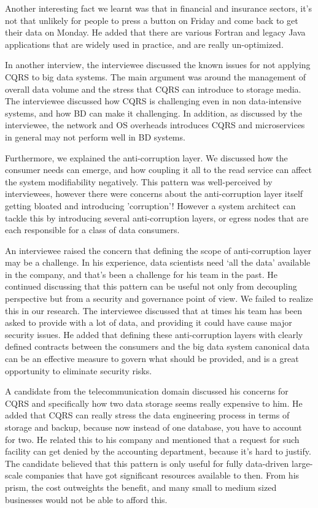 \documentclass{bmcart}
\begin{document}
Another interesting fact we learnt was that in financial and insurance sectors, it's not that unlikely for people to press a button on Friday and come back to get their data on Monday. He added that there are various Fortran and legacy Java applications that are widely used in practice, and are really un-optimized.


In another interview, the interviewee discussed the known issues for not applying CQRS to big data systems. The main argument was around the management of overall data volume and the stress that CQRS can introduce to storage media. The interviewee discussed how CQRS is challenging even in non data-intensive systems, and how BD can make it challenging. In addition, as discussed by the interviewee, the network and OS overheads introduces CQRS and microservices in general \cite{sriraman2018mu} may not perform well in BD systems.

Furthermore, we explained the anti-corruption layer. We discussed how the consumer needs can emerge, and how coupling it all to the read service can affect the system modifiability negatively. This pattern was well-perceived by interviewees, however there were concerns about the anti-corruption layer itself getting bloated and introducing 'corruption'! However a system architect can tackle this by introducing several anti-corruption layers, or egress nodes that are each responsible for a class of data consumers. 

An interviewee raised the concern that defining the scope of anti-corruption layer may be a challenge. In his experience, data scientists need `all the data' available in the company, and that's been a challenge for his team in the past. He continued discussing that this pattern can be useful not only from decoupling perspective but from a security and governance point of view. We failed to realize this in our research. The interviewee discussed that at times his team has been asked to provide with a lot of data, and providing it could have cause major security issues. He added that defining these anti-corruption layers with clearly defined contracts between the consumers and the big data system canonical data can be an effective measure to govern what should be provided, and is a great opportunity to eliminate security risks. 

A candidate from the telecommunication domain discussed his concerns for CQRS and specifically how two data storage seems really expensive to him. He added that CQRS can really stress the data engineering process in terms of storage and backup, because now instead of one database, you have to account for two. He related this to his company and mentioned that a request for such facility can get denied by the accounting department, because it's hard to justify. The candidate believed that this pattern is only useful for fully data-driven large-scale companies that have got significant resources available to then. From his prism, the cost outweights the benefit, and many small to medium sized businesses would not be able to afford this. 
\end{document}
